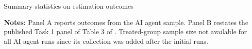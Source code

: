 \begin{table}[!htbp]
\centering
\caption{Summary statistics on estimation outcomes}
\label{tab:appendix-summary-nhk}
\small
\resizebox{\textwidth}{!}{}
\caption*{\textbf{Notes:} Panel A reports outcomes from the AI agent sample. Panel B restates the published Task 1 panel of Table 3 of \citet{huntingtonklein2025sources}. Treated-group sample size not available for all AI agent runs since its collection was added after the initial runs.}
\end{table}
\FloatBarrier